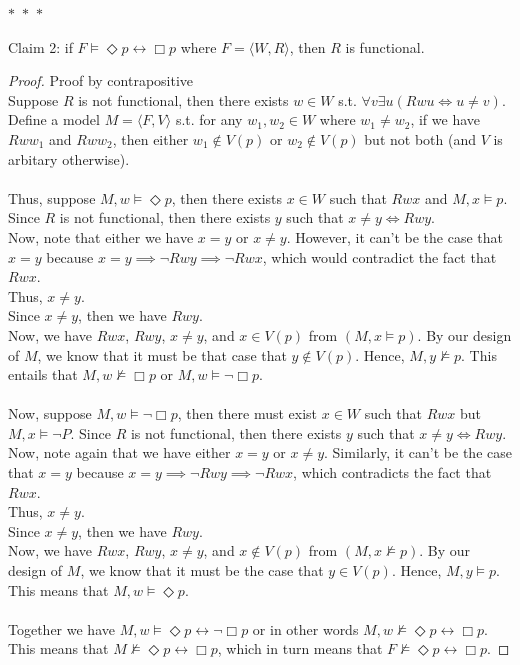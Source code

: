 \documentclass[12pt]{article}
\newcommand{\B}{\Box}
\newcommand{\D}{\Diamond}
\newcommand{\s}{\vDash}
\newcommand{\ns}{\nvDash}
\begin{document}
\noindent
\begin{center}
    $\ast$~$\ast$~$\ast$
\end{center}
Claim 2: if $F \vDash \D p \leftrightarrow \B p$ where $F = \langle W, R \rangle$, then $R$ is functional. 
\begin{proof} Proof by contrapositive\\
    Suppose $R$ is not functional, then there exists $w \in W$ s.t. $\forall v \exists u (Rwu \iff u \neq v)$.
    Define a model $M = \langle F, V \rangle$ s.t. for any $w_1, w_2 \in W$ where $w_1 \neq w_2$, if we have $Rww_1$ and $Rww_2$, then either $w_1 \notin V(p)$ or $w_2 \notin V(p)$ but not both (and $V$ is arbitary otherwise).\\
    \\
    Thus, suppose $M, w \s \D p$, then there exists $x \in W$ such that $Rwx$ and $M, x \s p$.
    Since $R$ is not functional, then there exists $y$ such that $x \neq y \iff Rwy$.\\
    Now, note that either we have $x = y$ or $x \neq y$. 
    However, it can't be the case that $x = y$ because $x = y \implies \neg Rwy \implies \neg Rwx$, which would contradict the fact that $Rwx$.\\
    Thus, $x \neq y$.\\
    Since $x \neq y$, then we have $Rwy$.\\
    Now, we have $Rwx$, $Rwy$, $x \neq y$, and $x \in V(p)$ from $(M, x \s p)$.
    By our design of $M$, we know that it must be that case that $y \notin V(p)$.
    Hence, $M, y \ns p$. This entails that $M, w \ns \B p$ or $M, w \s \neg \B p$.\\
    \\
    Now, suppose $M, w \s \neg \B p$, then there must exist $x \in W$ such that $Rwx$ but $M,x \s \neg P$.
    Since $R$ is not functional, then there exists $y$ such that $x \neq y \iff Rwy$.\\
    Now, note again that we have either $x = y$ or $x \neq y$. 
    Similarly, it can't be the case that $x = y$ because $x = y \implies \neg Rwy \implies \neg Rwx$, which contradicts the fact that $Rwx$.\\
    Thus, $x \neq y$.\\
    Since $x \neq y$, then we have $Rwy$.\\
    Now, we have $Rwx$, $Rwy$, $x \neq y$, and $x \notin V(p)$ from $(M, x \ns p)$. 
    By our design of $M$, we know that it must be the case that $y \in V(p)$.
    Hence, $M, y \s p$. This means that $M, w \s \D p$.\\
    \\
    Together we have $M, w \s \D p \leftrightarrow \neg \B p$ or in other words $M, w \ns \D p \leftrightarrow \B p$. 
    This means that $M \ns \D p \leftrightarrow \B p$, which in turn means that $F \ns \D p \leftrightarrow \B p$.
\end{proof}
\end{document}
